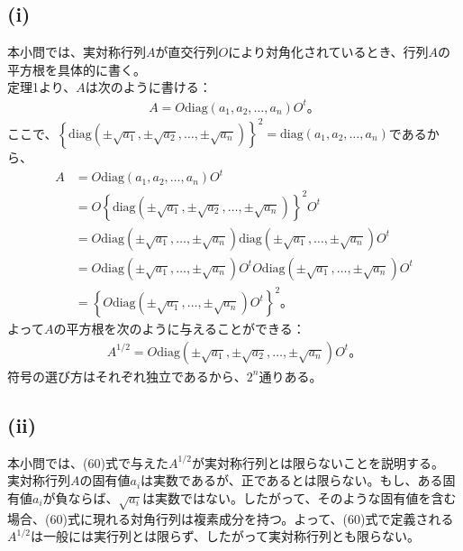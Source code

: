   \subsection*{(i)}
  本小問では、実対称行列$A$が直交行列$O$により対角化されているとき、行列$A$の平方根を具体的に書く。\\
  定理1より、$A$は次のように書ける：
  \begin{align*}
    A=O\mathrm{diag}(a_1,a_2,\ldots,a_n)O^{t}。
  \end{align*}
  ここで、$\left\{\mathrm{diag}(\pm\sqrt{a_1},\pm\sqrt{a_2},\ldots,\pm\sqrt{a_n})\right\}^2=\mathrm{diag}(a_1,a_2,\ldots,a_n)$であるから、
  \begin{align*}
    A&=O\mathrm{diag}(a_1,a_2,\ldots,a_n)O^{t}\\
    &=O\left\{\mathrm{diag}(\pm\sqrt{a_1},\pm\sqrt{a_2},\ldots,\pm\sqrt{a_n})\right\}^2O^t\\
    &=O\mathrm{diag}(\pm\sqrt{a_1},\ldots,\pm\sqrt{a_n})\mathrm{diag}(\pm\sqrt{a_1},\ldots,\pm\sqrt{a_n})O^{t}\\
    &=O\mathrm{diag}(\pm\sqrt{a_1},\ldots,\pm\sqrt{a_n})O^{t}O\mathrm{diag}(\pm\sqrt{a_1},\ldots,\pm\sqrt{a_n})O^{t}\\
    &=\left\{O\mathrm{diag}(\pm\sqrt{a_1},\ldots,\pm\sqrt{a_n})O^{t}\right\}^2。
  \end{align*}
  よって$A$の平方根を次のように与えることができる：
  \begin{align*}
    A^{1/2}=O\mathrm{diag}(\pm\sqrt{a_1},\pm\sqrt{a_2},\ldots,\pm\sqrt{a_n})O^{t}。\tag{60}
  \end{align*}
  符号の選び方はそれぞれ独立であるから、$2^n$通りある。
  
  
  \subsection*{(ii)}
  本小問では、(60)式で与えた$A^{1/2}$が実対称行列とは限らないことを説明する。\\
  実対称行列$A$の固有値$a_i$は実数であるが、正であるとは限らない。もし、ある固有値$a_i$が負ならば、$\sqrt{a_i}$は実数ではない。したがって、そのような固有値を含む場合、(60)式に現れる対角行列は複素成分を持つ。よって、(60)式で定義される$A^{1/2}$は一般には実行列とは限らず、したがって実対称行列とも限らない。
  
